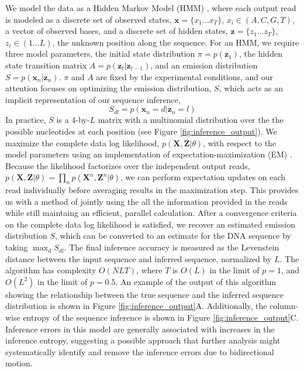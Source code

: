 \documentclass{biophys_letter}
\begin{document}
We model the data as a Hidden Markov Model (HMM) \cite{Rabiner:1989}, where each output read is modeled as a discrete set of observed states, $\mathbf{x}=\{x_{1}\dots x_{T}\}$, $x_i \in (A,C,G,T)$, a vector of observed bases, and a discrete set of hidden states, $\mathbf{z}=\{z_{1} \dots z_{T}\}$, $z_i \in (1 \dots L)$, the unknown position along the sequence.
For an HMM, we require three model parameters, the initial state distribution $\pi=p(\mathbf{z}_{1})$, the hidden state transition matrix $A=p(\mathbf{z}_{t}|\mathbf{z}_{t-1})$, and an emission distribution $S=p(\mathbf{x}_{n}|\mathbf{z}_{n})$. 
$\pi$ and $A$ are fixed by the experimental conditions, and our attention focuses on optimizing the emission distribution, $S$, which acts as an implicit representation of our sequence inference,
\begin{equation}
  S_{dl} = p(\mathbf{x}_n = d |\mathbf{z}_{n} = l)
\end{equation}
In practice, $S$ is a 4-by-$L$ matrix with a multinomial distribution over the the possible nucleotides at each position (see Figure \ref{fig:inference_output}).
We maximize the complete data log likelihood, $p(\mathbf{X},\mathbf{Z}|\theta)$, with respect to the model parameters using an implementation of expectation-maximization (EM) \cite{Baum:1970}.
Because the likelihood factorizes over the independent output reads, $p(\mathbf{X},\mathbf{Z}|\theta)=\prod_{n}p(\mathbf{X}^n,\mathbf{Z}^n|\theta)$, we can perform expectation updates on each read individually before averaging results in the maximization step.
This provides us with a method of jointly using the all the information provided in the reads while still maintaing an efficient, parallel calculation.
After a convergence criteria on the complete data log likelihood is satisfied, we recover an estimated emission distribution $S$, which can be converted to an estimate for the DNA sequence by taking $\mathrm{\max_{d}} {S_{dl}}$.
The final inference accuracy is measured as the Levenstein distance between the input sequence and inferred sequence, normalized by $L$.
The algorithm has complexity $O(NLT)$, where $T$ is $O(L)$ in the limit of $p=1$, and $O(L^2)$ in the limit of $p=0.5$.
An example of the output of this algorithm showing the relationship between the true sequence and the inferred sequence distribution is shown in Figure \ref{fig:inference_output}A.
Additionally, the column-wise entropy of the sequence inference is shown in Figure \ref{fig:inference_output}C.
Inference errors in this model are generally associated with increases in the inference entropy, suggesting a possible approach that further analysis might systematically identify and remove the inference errors due to bidirectional motion.
\end{document}

